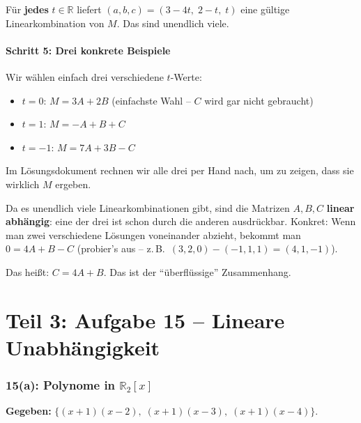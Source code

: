 \documentclass[a4paper,12pt]{article}
\begin{document}
F\"ur \textbf{jedes} $t \in \mathbb{R}$ liefert $(a,b,c) = (3-4t,\; 2-t,\; t)$ eine g\"ultige Linearkombination von $M$. Das sind unendlich viele.

\subsection*{Schritt 5: Drei konkrete Beispiele}

Wir w\"ahlen einfach drei verschiedene $t$-Werte:
\begin{itemize}
    \item $t = 0$: \; $M = 3A + 2B$ \quad (einfachste Wahl -- $C$ wird gar nicht gebraucht)
    \item $t = 1$: \; $M = -A + B + C$
    \item $t = -1$: \; $M = 7A + 3B - C$
\end{itemize}

Im L\"osungsdokument rechnen wir alle drei per Hand nach, um zu zeigen, dass sie wirklich $M$ ergeben.

\begin{merkbox}[title={Was bedeutet das geometrisch?}]
Da es unendlich viele Linearkombinationen gibt, sind die Matrizen $A, B, C$ \textbf{linear abh\"angig}: eine der drei ist schon durch die anderen ausdr\"uckbar. Konkret: Wenn man zwei verschiedene L\"osungen voneinander abzieht, bekommt man $0 = 4A + B - C$ (probier's aus -- z.\,B.\ $(3,2,0) - (-1,1,1) = (4, 1, -1)$).

Das hei\ss t: $C = 4A + B$. Das ist der ``\"uberfl\"ussige'' Zusammenhang.
\end{merkbox}

\newpage

\part*{Teil 3: Aufgabe 15 -- Lineare Unabh\"angigkeit}

\section*{15(a): Polynome in $\mathbb{R}_2[x]$}

\textbf{Gegeben:} $\{(x+1)(x-2),\; (x+1)(x-3),\; (x+1)(x-4)\}$.
\end{document}
